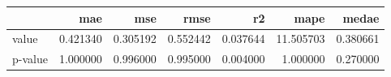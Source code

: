 \begin{tabular}{lrrrrrr}
\toprule
 & mae & mse & rmse & r2 & mape & medae \\
\midrule
value & 0.421340 & 0.305192 & 0.552442 & 0.037644 & 11.505703 & 0.380661 \\
p-value & 1.000000 & 0.996000 & 0.995000 & 0.004000 & 1.000000 & 0.270000 \\
\bottomrule
\end{tabular}
